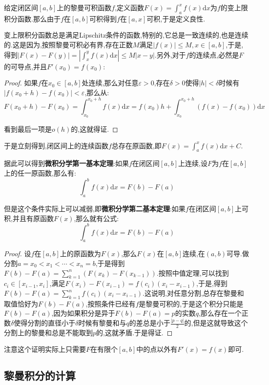 给定闭区间$[a,b]$上的黎曼可积函数$f$,定义函数$F(x)=\int_a^xf(x)\mathrm{d}x$为$f$的变上限积分函数.那么由于$f$在$[a,b]$可积得到$f$在$[a,x]$可积,于是定义良性.

变上限积分函数总是满足Lipschitz条件的函数,特别的,它总是一致连续的,也是连续的.这是因为,按照黎曼可积必有界,存在正数$M$满足$|f(x)|\le M,x\in[a,b]$,于是,得到$|F(x)-F(y)|=\left|\int_x^yf(x)\mathrm{d}x\right|\le M|x-y|$.另外,对于$f$的连续点,必然是$F$的可导点,并且$F'(x_0)=f(x_0)$:
\begin{proof}
	
	如果$f$在$x_0\in[a,b]$处连续,那么对任意$\varepsilon>0$,存在$\delta>0$使得$|h|<\delta$时候有$\left|f(x_0+h)-f(x_0)\right|<\varepsilon$,那么从:
	$$F(x_0+h)-F(x_0)=\int_{x_0}^{x_0+h}f(x)\mathrm{d}x=f(x_0)h+\int_{x_0}^{x_0+h}\left(f(x)-f(x_0)\right)\mathrm{d}x$$
	
	看到最后一项是$o(h)$的,这就得证.
	
\end{proof}

于是立刻得到,闭区间上的连续函数$f$总存在原函数,即$F(x)=\int_a^xf(x)\mathrm{d}x+C$.

据此可以得到\textbf{微积分学第一基本定理}:如果$f$在闭区间$[a,b]$上连续,设$F$为$f$在$[a,b]$上的任一原函数,那么有:
$$\int_a^bf(x)\mathrm{d}x=F(b)-F(a)$$

但是这个条件实际上可以减弱,即\textbf{微积分学第二基本定理}:如果$f$在闭区间$[a,b]$上可积,并且有原函数$F(x)$,那么就有公式:
$$\int_a^bf(x)\mathrm{d}x=F(b)-F(a)$$
\begin{proof}
	
	设$f$在$[a,b]$上的原函数为$F(x)$,那么$F(x)$在$[a,b]$连续,在$(a,b)$可导.做分割$a=x_0<x_1<\cdots<x_n=b$,于是得到$F(b)-F(a)=\sum_{k=1}^{n}\left(F(x_{k})-F(x_{k-1})\right)$.按照中值定理,可以找到$c_i\in[x_{i-1},x_i]$,满足$F(x_i)-F(x_{i-1})=f(c_i)(x_i-x_{i-1})$,于是,得到$F(b)-F(a)=\sum_{k=1}^{n}f(c_i)(x_i-x_{i-1})$.这说明,对任意分割,总存在黎曼和取值恰好为$F(b)-F(a)$,按照条件已经有$f$是黎曼可积的,于是这个积分只能是$F(b)-F(a)$,因为如果积分是异于$F(b)-F(a)=p$的实数$q$,那么存在一个正数$\delta$使得分割的直径小于$\delta$时候有黎曼和与$q$的差总是小于$\frac{|p-q|}{2}$的,但是这就导致这个分割上的黎曼和总是不能取到$p$的,这就矛盾.于是得证.
	
\end{proof}

注意这个证明实际上只需要$F$在有限个$[a,b]$中的点以外有$F'(x)=f(x)$即可.
\newpage
\subsection{黎曼积分的计算}

